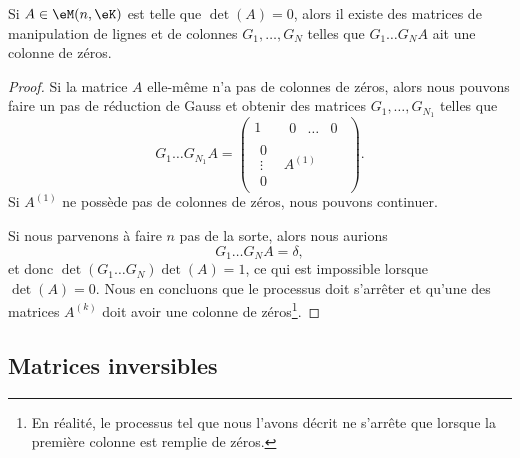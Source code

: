 \begin{proposition} \label{PROPooPMYCooAAtHsB}
    Si \( A\in \eM(n,\eK)\) est telle que \( \det(A)=0\), alors il existe des matrices de manipulation de lignes et de colonnes \( G_1,\ldots, G_N\) telles que \( G_1\ldots G_NA\) ait une colonne de zéros.
\end{proposition}

\begin{proof}
    Si la matrice \( A\) elle-même n'a pas de colonnes de zéros, alors nous pouvons faire un pas de réduction de Gauss et obtenir des matrices \( G_1,\ldots,  G_{N_1}\) telles que
    \begin{equation}
        G_1\ldots G_{N_1}A=
      \begin{pmatrix}
            1    &   \begin{matrix} 
                0    &   \ldots    &   0    
            \end{matrix}\\ 
            \begin{matrix}
                0    \\ 
                \vdots    \\ 
                0    
            \end{matrix}& A^{(1)}
        \end{pmatrix}.
    \end{equation}
    Si \( A^{(1)}\) ne possède pas de colonnes de zéros, nous pouvons continuer. 

    Si nous parvenons à faire \( n\) pas de la sorte, alors nous aurions
    \begin{equation}
        G_1\ldots G_NA=\delta,
    \end{equation}
    et donc \( \det(G_1\ldots G_N)\det(A)=1\), ce qui est impossible lorsque \( \det(A)=0\). Nous en concluons que le processus doit s'arrêter et qu'une des matrices \( A^{(k)}\) doit avoir une colonne de zéros\footnote{En réalité, le processus tel que nous l'avons décrit ne s'arrête que lorsque la première colonne est remplie de zéros.}.
\end{proof}

\subsection{Matrices inversibles}

